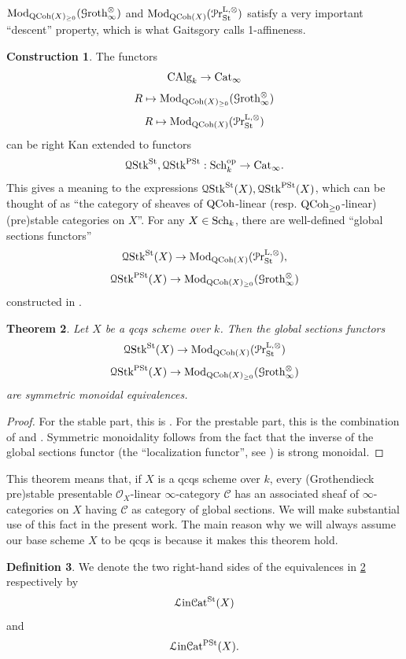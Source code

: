 \documentclass[11pt, twoside]{article} %
\numberwithin{equation}{section}
\theoremstyle{plain}
\newtheorem{thm}{Theorem}[section]
\theoremstyle{definition}
\newtheorem{defin}[thm]{Definition}
\newtheorem{construction}[thm]{Construction}
\newcommand{\cc}{\mathcal C}
\newcommand{\QCoh}{\textup{QCoh}}
\renewcommand{\Pr}{\mathcal P\textup{r}}
\newcommand{\cG}{\mathcal G}
\newcommand{\Cat}{\textup{Cat}}
\newcommand{\cO}{{\mathcal O}}
\newcommand{\Sch}{\textup{Sch}}
\newcommand{\Mod}{\textup{Mod}}
\newcommand{\Lin}{\mathcal L\textup{in}\mathcal{C}\textup{at}^{\textup{St}}}
\newcommand{\Linpre}{{\mathcal L\textup{in}\mathcal{C}\textup{at}^{\textup{PSt}}}}
\newcommand{\QStk}{\mathcal Q\textup{Stk}^\textup{St}}
\newcommand{\QStkpre}{\mathcal Q\textup{Stk}^\textup{PSt}}
\newcommand{\Groth}{\cG\textup{roth}}
\begin{document}
		
			
	$\Mod_{\QCoh(X)_{\geq 0}}(\Groth_\infty^\otimes)$ and $\Mod_{\QCoh(X)}(\Pr^{\textup L, \otimes}_{\textup{St}})$ satisfy a very important ``descent'' property, which is what Gaitsgory \cite{Gaitsgory-affineness} calls 1-affineness.
	
	\begin{construction}
		The functors $$\textup{CAlg}_k\to \Cat_\infty$$
		$$R\mapsto \Mod_{\QCoh(X)_{\geq 0}}(\Groth_\infty^\otimes)$$
		$$R\mapsto \Mod_{\QCoh(X)}(\Pr^{\textup L, \otimes}_{\textup{St}})$$
		can be right Kan extended to functors $$\QStk,\QStkpre:\Sch_k^\textup{op}\to \Cat_\infty.$$ This gives a meaning to the expressions $\QStk(X),\QStkpre(X)$, which can be thought of as ``the category of sheaves of $\QCoh$-linear (resp. $\QCoh_{\geq 0}$-linear) (pre)stable categories on $X$''. For any $X\in \Sch_k$, there are well-defined ``global sections functors'' $$\QStk(X)\to\Mod_{\QCoh(X)}(\Pr^{\textup L, \otimes}_{\textup{St}}),$$$$ \QStkpre(X)\to \Mod_{\QCoh(X)_{\geq 0}}(\Groth_\infty^\otimes)$$ constructed in \cite[discussion before Theorem 10.2.0.1]{SAG}.
		
		\end{construction}
	\begin{thm}\label{stack-of-categories}Let $X$ be a qcqs scheme over $k$. Then the global sections functors $$\QStk(X)\to \Mod_{\QCoh(X)}(\Pr^{\textup L, \otimes}_{\textup{St}})$$ $$\QStkpre(X)\to \Mod_{\QCoh(X)_{\geq 0}}(\Groth_\infty^\otimes)$$ are symmetric monoidal equivalences.\end{thm}
	\begin{proof} For the stable part, this is \cite[Proposition 6.5]{DAG-XI}. For the prestable part, this is the combination of \cite[Theorem 10.2.0.2]{SAG} and \cite[Theorem D.5.3.1]{SAG}. Symmetric monoidality follows from the fact that the inverse of the global sections functor (the ``localization functor'', see \cite[Section 2.3]{BP}) is strong monoidal.
	\end{proof}
	This theorem means that, if $X$ is a qcqs scheme over $k$, every (Grothendieck pre)stable presentable $\cO_X$-linear $\infty$-category $\cc$ has an associated sheaf of $\infty$-categories on $X$ having $\cc$ as category of global sections. We will make substantial use of this fact in the present work. The main reason why we will always assume our base scheme $X$ to be qcqs is because it makes this theorem hold.
	\begin{defin}\label{defin-prestable-stable-linear}We denote the two right-hand sides of the equivalences in \cref{stack-of-categories} respectively by $$\Lin(X)$$ and $$\Linpre(X).$$\end{defin}
		
\end{document}
